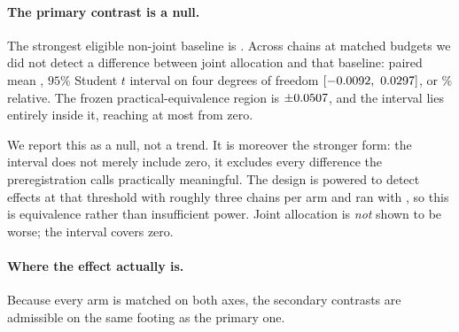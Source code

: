 \documentclass{article}
\begin{document}
\begin{table}[t]
\centering
\caption{\textbf{Per-arm results; selection-only and joint are indistinguishable.} Every arm
is matched on both budget axes, so all rows are mutually comparable. AUC regret is the area
under the generation-wise held-out human NLL-regret curve against each chain's own
generation-0 value (lower is better); SD is between-chain standard deviation over
\PilotSeeds{} chains; tail retention is the confirmatory outcome at the final generation
(higher is better). Bold marks the best value in a column, and both arms are bolded where
they tie at displayed precision.}
\label{tab:results}
{\small}
\end{table}

\paragraph{The primary contrast is a null.}
The strongest eligible non-joint baseline is \PilotPrimaryBaseline{}. Across \PilotChains{}
chains at matched budgets we did not detect a difference between joint allocation and that
baseline: paired mean \PilotPrimaryMean{}, $95\%$ Student $t$ interval on four degrees of
freedom $[\PilotPrimaryLow,\allowbreak\ \PilotPrimaryHigh]$, or \PilotPrimaryPct\% relative. The frozen
practical-equivalence region is $\pm0.0507{}$, and the interval lies entirely
inside it, reaching at most \PilotPrimaryReach{} from zero.

We report this as a null, not a trend. It is moreover the stronger form: the interval does
not merely include zero, it excludes every difference the preregistration calls practically
meaningful. The design is powered to detect effects at that threshold with roughly three
chains per arm and ran with \PilotSeeds{}, so this is equivalence rather than insufficient
power. Joint allocation is \emph{not} shown to be worse; the interval covers zero.

\paragraph{Where the effect actually is.}
Because every arm is matched on both axes, the secondary contrasts are admissible on the
same footing as the primary one.
\end{document}
